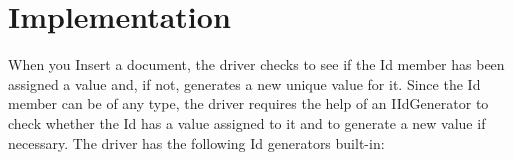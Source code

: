 \section{Implementation}


When you Insert a document, the driver checks to see if the Id member has been assigned a value
and, if not, generates a new unique value for it. Since the Id member can be of any type, the driver requires
the help of an IIdGenerator to check whether the Id has a value assigned to it and to generate a new value if necessary.
The driver has the following Id generators built-in:
